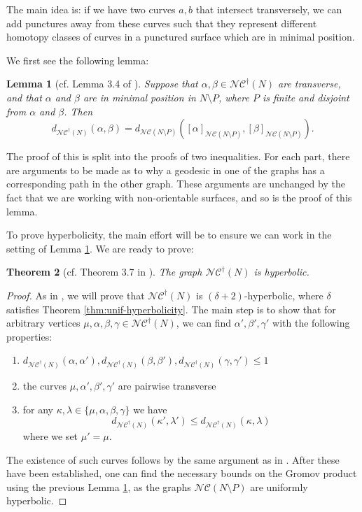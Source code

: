 \documentclass[a4paper]{article}
\newtheorem{theorem}{Theorem}[section]
\newtheorem{lemma}[theorem]{Lemma}
\newcommand{\ncg}{\mathcal{NC}}
\newcommand{\fncg}{\mathcal{NC}^\dagger}
\begin{document}
The main idea is: 
if we have two curves $a,b$ that intersect transversely, we can add punctures away from these curves such that they represent different homotopy classes of curves in a punctured surface which are in minimal position.

We first see the following lemma:
\begin{lemma}[cf. Lemma 3.4 of \cite{BHW1}]\label{lem:approx-by-NC}
    Suppose that $\alpha,\beta \in \fncg(N)$ are transverse, and that $\alpha$ and $\beta$ are in minimal position in $N\setminus P$, where $P$ is finite and disjoint from $\alpha$ and $\beta$.
    Then
    \[ d_{\fncg(N)}(\alpha,\beta) = d_{\ncg(N\setminus P)}([\alpha]_{\ncg(N\setminus P)},[\beta]_{\ncg(N\setminus P)}) .\]
\end{lemma}

The proof of this is split into the proofs of two inequalities.
For each part, there are arguments to be made as to why a geodesic in one of the graphs has a corresponding path in the other graph.
These arguments are unchanged by the fact that we are working with non-orientable surfaces, and so is the proof of this lemma.

To prove hyperbolicity, the main effort will be to ensure we can work in the setting of Lemma \ref{lem:approx-by-NC}.
We are ready to prove:

\begin{theorem}[cf. Theorem 3.7 in \cite{BHW1}]\label{thm:fine-cg-hyperbolic}
    The graph $\fncg(N)$ is hyperbolic.
\end{theorem}

\begin{proof}
    As in \cite{BHW1}, we will prove that $\fncg(N)$ is $(\delta +2)$-hyperbolic, where $\delta$ satisfies Theorem \ref{thm:unif-hyperbolicity}.
    The main step is to show that for arbitrary vertices $\mu,\alpha,\beta,\gamma \in\fncg(N)$, we can find $\alpha', \beta', \gamma'$ with the following properties:\begin{enumerate}
        \item $d_{\fncg(N)}(\alpha,\alpha'), d_{\fncg(N)}(\beta,\beta'), d_{\fncg(N)}(\gamma,\gamma') \leq 1$
        \item the curves $\mu, \alpha', \beta', \gamma'$ are pairwise transverse
        \item for any $\kappa, \lambda \in \{\mu, \alpha,\beta,\gamma\}$ we have
        \[d_{\fncg(N)}(\kappa', \lambda') \leq d_{\fncg(N)}(\kappa, \lambda)\]
        where we set $\mu' = \mu$.
    \end{enumerate}
    The existence of such curves follows by the same argument as in \cite{BHW1}.
    After these have been established, one can find the necessary bounds on the Gromov product using the previous Lemma \ref{lem:approx-by-NC}, as the graphs $\ncg(N\setminus P)$ are uniformly hyperbolic.
\end{proof}
\end{document}
